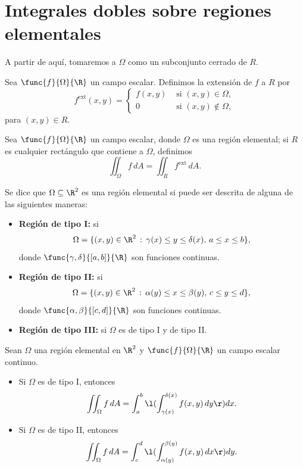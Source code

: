 \documentclass[a4,11pt]{aleph-notas}
\begin{document}
\section{Integrales dobles sobre regiones elementales}

A partir de aquí, tomaremos a $\Omega$ como un subconjunto cerrado de $R$.

\begin{defi}
    Sea $\func{f}{\Omega}{\R}$ un campo escalar. Definimos la extensión de $f$ a $R$ por
    \[
        f^{\text{ext}}(x,y) = \begin{cases}
                        f(x,y) & \text{ si } (x,y)\in \Omega, \\
                        0 & \text{ si } (x,y) \not\in \Omega,
                        \end{cases}
    \]
    para $(x,y)\in R$.
\end{defi}

\begin{defi}
    Sea $\func{f}{\Omega}{\R}$ un campo escalar, donde $\Omega$ es una región elemental; si $R$ es cualquier rectángulo que contiene a $\Omega$, definimos
    \[
        \iint_\Omega f\, dA = \iint_R f^{\text{ext}}\, dA.
    \]
\end{defi}

\begin{defi}
    Se dice que $\Omega\subseteq\R^2$ es una región elemental si puede ser descrita de alguna de las siguientes maneras:
    \begin{itemize}
        \item \textbf{Región de tipo I:} si
        \[
            \Omega=\{(x,y)\in\R^2 \, : \, \gamma(x) \leq y \leq \delta(x), \, a\leq x\leq b \},
        \]
        donde $\func{\gamma, \delta}{[a,b]}{\R}$ son funciones continuas.
        \item \textbf{Región de tipo II:} si
        \[
            \Omega=\{(x,y)\in\R^2 \, : \, \alpha(y) \leq x \leq \beta(y), \, c\leq y\leq d \},
        \]
        donde $\func{\alpha, \beta}{[c,d]}{\R}$ son funciones continuas.
        \item \textbf{Región de tipo III:} si $\Omega$ es de tipo I y de tipo II.
    \end{itemize}
\end{defi}

\begin{teo}
    Sean $\Omega$ una región elemental en $\R^2$ y $\func{f}{\Omega}{\R}$ un campo escalar continuo.
    \begin{itemize}
        \item Si $\Omega$ es de tipo I, entonces
        \[
            \iint_\Omega f\, dA = \int_a^b\l( \int_{\gamma(x)}^{\delta(x)}f(x,y) \, dy\r)dx.
        \]
        \item Si $\Omega$ es de tipo II, entonces
        \[
            \iint_\Omega f\, dA = \int_c^d\l( \int_{\alpha(y)}^{\beta(y)}f(x,y) \, dx\r)dy.
        \]
    \end{itemize}
\end{teo}
\end{document}
